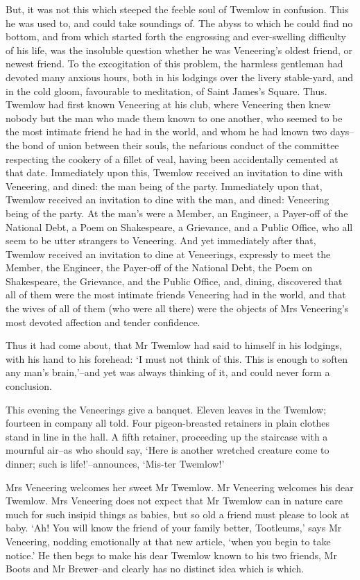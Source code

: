 But, it was not this which steeped the feeble soul of Twemlow in
confusion. This he was used to, and could take soundings of. The abyss
to which he could find no bottom, and from which started forth the
engrossing and ever-swelling difficulty of his life, was the insoluble
question whether he was Veneering’s oldest friend, or newest friend.
To the excogitation of this problem, the harmless gentleman had devoted
many anxious hours, both in his lodgings over the livery stable-yard,
and in the cold gloom, favourable to meditation, of Saint James’s
Square. Thus. Twemlow had first known Veneering at his club, where
Veneering then knew nobody but the man who made them known to one
another, who seemed to be the most intimate friend he had in the world,
and whom he had known two days--the bond of union between their souls,
the nefarious conduct of the committee respecting the cookery of
a fillet of veal, having been accidentally cemented at that date.
Immediately upon this, Twemlow received an invitation to dine with
Veneering, and dined: the man being of the party. Immediately upon
that, Twemlow received an invitation to dine with the man, and dined:
Veneering being of the party. At the man’s were a Member, an Engineer, a
Payer-off of the National Debt, a Poem on Shakespeare, a Grievance, and
a Public Office, who all seem to be utter strangers to Veneering. And
yet immediately after that, Twemlow received an invitation to dine at
Veneerings, expressly to meet the Member, the Engineer, the Payer-off
of the National Debt, the Poem on Shakespeare, the Grievance, and the
Public Office, and, dining, discovered that all of them were the most
intimate friends Veneering had in the world, and that the wives of all
of them (who were all there) were the objects of Mrs Veneering’s most
devoted affection and tender confidence.

Thus it had come about, that Mr Twemlow had said to himself in his
lodgings, with his hand to his forehead: ‘I must not think of this. This
is enough to soften any man’s brain,’--and yet was always thinking of
it, and could never form a conclusion.

This evening the Veneerings give a banquet. Eleven leaves in the
Twemlow; fourteen in company all told. Four pigeon-breasted retainers in
plain clothes stand in line in the hall. A fifth retainer, proceeding up
the staircase with a mournful air--as who should say, ‘Here is another
wretched creature come to dinner; such is life!’--announces, ‘Mis-ter
Twemlow!’

Mrs Veneering welcomes her sweet Mr Twemlow. Mr Veneering welcomes
his dear Twemlow. Mrs Veneering does not expect that Mr Twemlow can in
nature care much for such insipid things as babies, but so old a friend
must please to look at baby. ‘Ah! You will know the friend of your
family better, Tootleums,’ says Mr Veneering, nodding emotionally at
that new article, ‘when you begin to take notice.’ He then begs to make
his dear Twemlow known to his two friends, Mr Boots and Mr Brewer--and
clearly has no distinct idea which is which.

